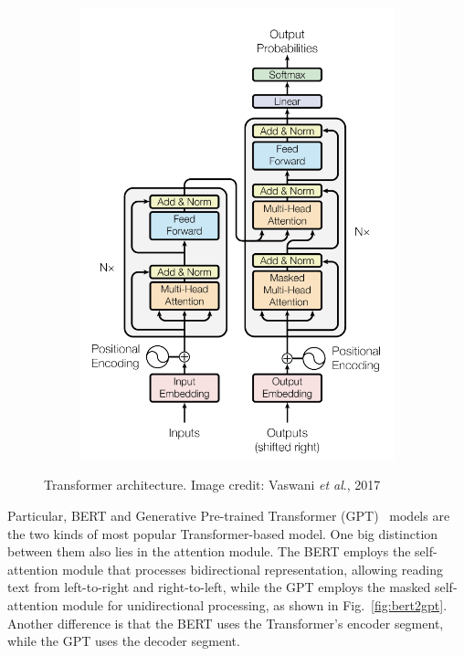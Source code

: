 \documentclass[]{article}
\newcommand{\etal}{\textit{et al}.}
\begin{document}
\begin{figure}[!h]
    \centering
    \begin{subfigure}[b]{0.5\textwidth}
        \includegraphics[width=\textwidth]{FIGS/transformer.png}
    \end{subfigure}
    \caption{Transformer architecture. Image credit: Vaswani \etal, 2017 \cite{vaswani2017attention}}
    \label{fig:transformer}
\end{figure}


Particular, BERT\cite{devlin2018bert} and Generative Pre-trained Transformer (GPT)~\cite{radford2019language} models are the two kinds of most popular Transformer-based model. 
One big distinction between them also lies in the attention module. The BERT employs the self-attention module that processes bidirectional representation, allowing reading text from left-to-right and right-to-left, while the GPT employs the masked self-attention module for unidirectional processing, as shown in Fig.~\ref{fig:bert2gpt}. Another difference is that the BERT uses the Transformer's encoder segment, while the GPT uses the decoder segment. 
\end{document}
